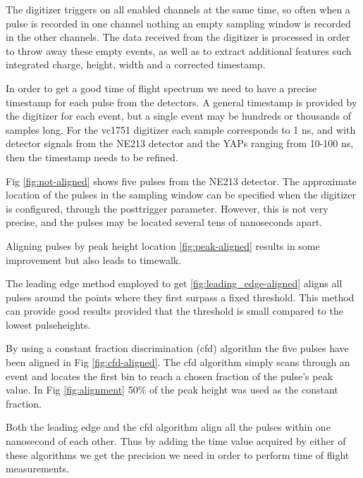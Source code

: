 \documentclass[main.tex]{subfiles}
\begin{document}

The digitizer triggers on all enabled channels at the same time, so often when a pulse is recorded in one channel nothing an empty sampling window is recorded in the other channels. The data received from the digitizer is processed in order to throw away these empty events, as well as to extract additional features such integrated charge, height, width and a corrected timestamp.

In order to get a good time of flight spectrum we need to have a precise timestamp for each pulse from the detectors. A general timestamp is provided by the digitizer for each event, but a single event may be hundreds or thousands of samples long. For the vc1751 digitizer each sample corresponds to 1 ns, and with detector signals from the NE213 detector and the YAPs ranging from 10-100 ns, then the timestamp needs to be refined.

Fig \ref{fig:not-aligned} shows five pulses from the NE213 detector. The approximate location of the pulses in the sampling window can be specified when the digitizer is configured, through the posttrigger parameter. However, this is not very precise, and the pulses may be located several tens of nanoseconds apart. 

Aligning pulses by peak height location \ref{fig:peak-aligned} results in some improvement but also leads to timewalk.

The leading edge method employed to get \ref{fig:leading_edge-aligned} aligns all pulses around the points where they first surpass a fixed threshold. This method can provide good results provided that the threshold is small compared to the lowest pulseheights. 

By using a constant fraction discrimination (cfd) algorithm the five pulses have been aligned in Fig \ref{fig:cfd-aligned}. The cfd algorithm simply scans through an event and locates the first bin to reach a chosen fraction of the pulse's peak value. In Fig \ref{fig:alignment} 50\% of the peak height was used as the constant fraction. 

Both the leading edge and the cfd algorithm align all the pulses within one nanosecond of each other. Thus by adding the time value acquired by either of these algorithms we get the precision we need in order to perform time of flight measurements.
\end{document}
